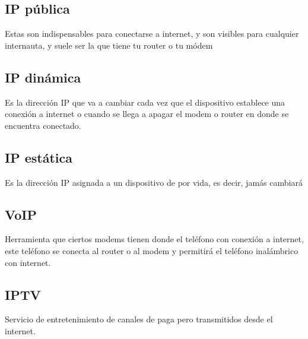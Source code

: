 \documentclass[letterpaper,12pt]{article}
\begin{document}
\begin{sloppypar}
\subsection{IP pública}
Estas son indispensables para conectarse a internet, y son visibles para cualquier internauta, y suele ser la que tiene tu router o tu módem 

\subsection{IP dinámica}
Es la dirección IP que va a cambiar cada vez que el dispositivo establece una conexión a internet o cuando se llega a apagar el modem o router en donde se encuentra conectado.

\subsection{IP estática}
Es la dirección IP asignada a un dispositivo de por vida, es decir, jamás cambiará

\subsection{VoIP}
Herramienta que ciertos modems tienen donde el teléfono con conexión a internet, este teléfono se conecta al router o al modem y permitirá el teléfono inalámbrico con internet.

\subsection{IPTV}
Servicio de entretenimiento de canales de paga pero transmitidos desde el internet.

\end{sloppypar}
\end{document}
